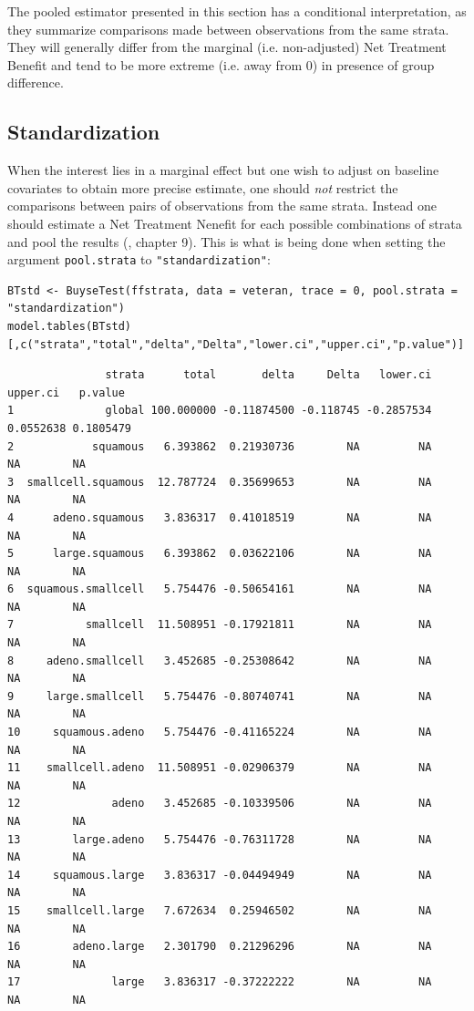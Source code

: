 \documentclass[12pt]{article}
\newcommand\Warning[1][3ex]{%
\renewcommand\stacktype{L}%
\scaleto{\stackon[1.3pt]{\color{red}$\triangle$}{\tiny\bfseries !}}{#1}%
\xspace
}
\begin{document}
\Warning The pooled estimator presented in this section has a
conditional interpretation, as they summarize comparisons made between
observations from the same strata. They will generally differ from the
marginal (i.e. non-adjusted) Net Treatment Benefit and tend to be more
extreme (i.e. away from 0) in presence of group difference.

\subsection{Standardization}
\label{sec:orgcb481ed}

When the interest lies in a marginal effect but one wish to adjust on
baseline covariates to obtain more precise estimate, one should \emph{not}
restrict the comparisons between pairs of observations from the same
strata. Instead one should estimate a Net Treatment Nenefit for each
possible combinations of strata and pool the results
(\cite{buyse2025gpc}, chapter 9). This is what is being done when
setting the argument \texttt{pool.strata} to \texttt{"standardization"}:
\lstset{language=r,label= ,caption= ,captionpos=b,numbers=none}
\begin{lstlisting}
BTstd <- BuyseTest(ffstrata, data = veteran, trace = 0, pool.strata = "standardization")
model.tables(BTstd)[,c("strata","total","delta","Delta","lower.ci","upper.ci","p.value")]
\end{lstlisting}

\begin{verbatim}
               strata      total       delta     Delta   lower.ci  upper.ci   p.value
1              global 100.000000 -0.11874500 -0.118745 -0.2857534 0.0552638 0.1805479
2            squamous   6.393862  0.21930736        NA         NA        NA        NA
3  smallcell.squamous  12.787724  0.35699653        NA         NA        NA        NA
4      adeno.squamous   3.836317  0.41018519        NA         NA        NA        NA
5      large.squamous   6.393862  0.03622106        NA         NA        NA        NA
6  squamous.smallcell   5.754476 -0.50654161        NA         NA        NA        NA
7           smallcell  11.508951 -0.17921811        NA         NA        NA        NA
8     adeno.smallcell   3.452685 -0.25308642        NA         NA        NA        NA
9     large.smallcell   5.754476 -0.80740741        NA         NA        NA        NA
10     squamous.adeno   5.754476 -0.41165224        NA         NA        NA        NA
11    smallcell.adeno  11.508951 -0.02906379        NA         NA        NA        NA
12              adeno   3.452685 -0.10339506        NA         NA        NA        NA
13        large.adeno   5.754476 -0.76311728        NA         NA        NA        NA
14     squamous.large   3.836317 -0.04494949        NA         NA        NA        NA
15    smallcell.large   7.672634  0.25946502        NA         NA        NA        NA
16        adeno.large   2.301790  0.21296296        NA         NA        NA        NA
17              large   3.836317 -0.37222222        NA         NA        NA        NA
\end{verbatim}
\end{document}
